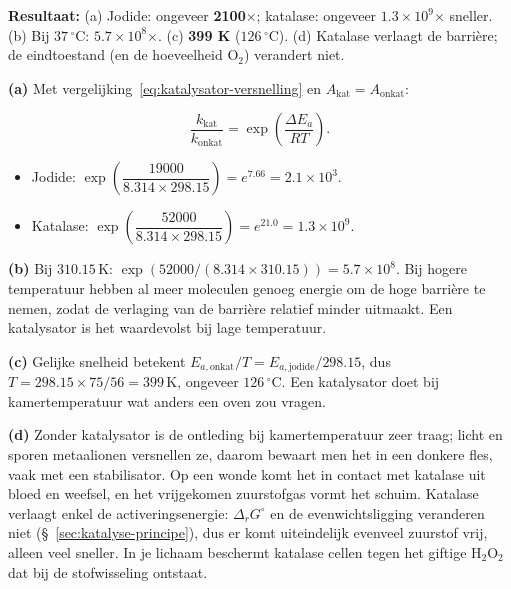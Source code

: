 \begin{oplossing}
\textbf{Resultaat:} (a) Jodide: ongeveer \textbf{2100\ensuremath{\times{}}}; katalase: ongeveer \textbf{\(1.3\times10^{9}\)\ensuremath{\times{}}} sneller. (b) Bij \(37\,^\circ\mathrm{C}\): \textbf{\(5.7\times10^{8}\)\ensuremath{\times{}}}. (c) \textbf{399 K} (\(126\,^\circ\mathrm{C}\)). (d) Katalase verlaagt de barrière; de eindtoestand (en de hoeveelheid \(\mathrm{O_2}\)) verandert niet.

\textbf{(a)} Met vergelijking~\eqref{eq:katalysator-versnelling} en \(A_{\text{kat}} = A_{\text{onkat}}\):

\[
\frac{k_{\text{kat}}}{k_{\text{onkat}}} = \exp\!\left(\frac{\Delta E_a}{RT}\right).
\]

\begin{itemize}
\item
  Jodide: \(\exp\!\left(\dfrac{19000}{8.314 \times 298.15}\right) = e^{7.66} = 2.1\times10^{3}\).
\item
  Katalase: \(\exp\!\left(\dfrac{52000}{8.314 \times 298.15}\right) = e^{21.0} = 1.3\times10^{9}\).
\end{itemize}

\textbf{(b)} Bij \(310.15\,\mathrm{K}\): \(\exp(52000/(8.314 \times 310.15)) = 5.7\times10^{8}\). Bij hogere temperatuur hebben al meer moleculen genoeg energie om de hoge barrière te nemen, zodat de verlaging van de barrière relatief minder uitmaakt. Een katalysator is het waardevolst bij lage temperatuur.

\textbf{(c)} Gelijke snelheid betekent \(E_{a,\text{onkat}}/T = E_{a,\text{jodide}}/298.15\), dus \(T = 298.15 \times 75/56 = 399\,\mathrm{K}\), ongeveer \(126\,^\circ\mathrm{C}\). Een katalysator doet bij kamertemperatuur wat anders een oven zou vragen.

\textbf{(d)} Zonder katalysator is de ontleding bij kamertemperatuur zeer traag; licht en sporen metaalionen versnellen ze, daarom bewaart men het in een donkere fles, vaak met een stabilisator. Op een wonde komt het in contact met katalase uit bloed en weefsel, en het vrijgekomen zuurstofgas vormt het schuim. Katalase verlaagt enkel de activeringsenergie: \(\Delta_rG^\circ\) en de evenwichtsligging veranderen niet (\S~\ref{sec:katalyse-principe}), dus er komt uiteindelijk evenveel zuurstof vrij, alleen veel sneller. In je lichaam beschermt katalase cellen tegen het giftige \(\mathrm{H_2O_2}\) dat bij de stofwisseling ontstaat.
\end{oplossing}

